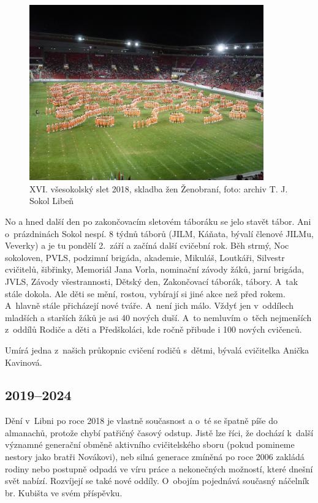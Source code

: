 \documentclass[a5paper, 11pt, twoside]{article}
\begin{document}
\begin{figure}[hp]
  \centering 
  \includegraphics[width=0.9\textwidth]{img/65_zenobrani.JPG}
  \caption*{XVI. všesokolský slet 2018, skladba žen Ženobraní, foto: archiv T.
  J. Sokol Libeň}
\end{figure}

No a hned další den po zakončovacím sletovém táboráku se jelo stavět
tábor. Ani o~prázdninách Sokol nespí. 8 týdnů táborů (JILM, Káňata,
bývalí členové JILMu, Veverky) a je tu pondělí 2.~září a začíná další
cvičební rok. Běh strmý, Noc sokoloven, PVLS, podzimní brigáda,
akademie, Mikuláš, Loutkáři, Silvestr cvičitelů, šibřinky, Memoriál Jana
Vorla, nominační závody žáků, jarní brigáda, JVLS, Závody všestrannosti,
Dětský den, Zakončovací táborák, tábory. A~tak stále dokola. Ale děti se
mění, rostou, vybírají si jiné akce než před rokem. A~hlavně stále
přicházejí nové tváře. A~není jich málo. Vždyť jen v~oddílech mladších a
starších žáků je asi 40 nových duší. A~to nemluvím o~těch nejmenších
z~oddílů Rodiče a děti a Předškoláci, kde ročně přibude i 100 nových
cvičenců.

Umírá jedna z~našich průkopnic cvičení rodičů s~dětmi, bývalá cvičitelka
Anička Kavinová.

\afterpage{\clearpage}

\subsection{2019--2024}

Dění v~Libni po roce 2018 je vlastně současnost a o~té se špatně píše do
almanachů, protože chybí patřičný časový odstup. Jistě lze říci, že
dochází k~další významné generační obměně aktivního cvičitelského sboru
(pokud pomineme nestory jako bratři Novákovi), neb silná generace
zmíněná po roce 2006 zakládá rodiny nebo postupně odpadá ve víru práce a
nekonečných možností, které dnešní svět nabízí. Rozvíjejí se také nové
oddíly. O~obojím pojednává současný náčelník br. Kubišta ve svém
příspěvku.
\end{document}
